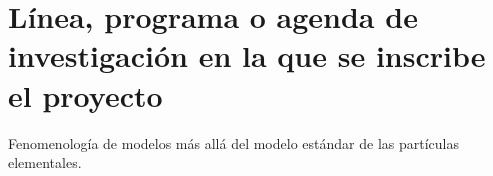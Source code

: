 
\section{Línea, programa o agenda de investigación en la que se inscribe el proyecto}
Fenomenología de modelos más allá del modelo estándar de las partículas elementales.

